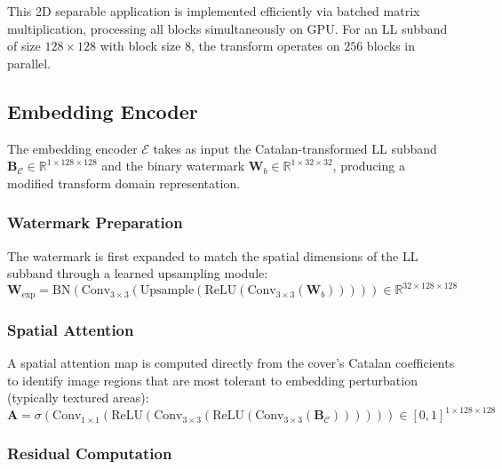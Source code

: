\documentclass[journal]{IEEEtran}
\begin{document}
This 2D separable application is implemented efficiently via batched
matrix multiplication, processing all blocks simultaneously on GPU.
For an LL subband of size $128 \times 128$ with block size $8$, the
transform operates on $256$ blocks in parallel.

\subsection{Embedding Encoder}

The embedding encoder $\mathcal{E}$ takes as input the Catalan-transformed
LL subband $\mathbf{B}_{\mathcal{C}} \in \mathbb{R}^{1 \times 128 \times 128}$
and the binary watermark $\mathbf{W}_b \in \mathbb{R}^{1 \times 32 \times 32}$,
producing a modified transform domain representation.

\subsubsection{Watermark Preparation}

The watermark is first expanded to match the spatial dimensions of the
LL subband through a learned upsampling module:
\begin{equation}
  \mathbf{W}_{\text{exp}} = \text{BN}(\text{Conv}_{3\times3}(
    \text{Upsample}(\text{ReLU}(\text{Conv}_{3\times3}(\mathbf{W}_b)))))
  \in \mathbb{R}^{32 \times 128 \times 128}
  \label{eq:wm_prep}
\end{equation}

\subsubsection{Spatial Attention}

A spatial attention map is computed directly from the cover's Catalan
coefficients to identify image regions that are most tolerant to embedding
perturbation (typically textured areas):
\begin{equation}
  \mathbf{A} = \sigma\!\left(\text{Conv}_{1\times1}(
    \text{ReLU}(\text{Conv}_{3\times3}(
      \text{ReLU}(\text{Conv}_{3\times3}(\mathbf{B}_{\mathcal{C}})))))\right)
  \in [0,1]^{1 \times 128 \times 128}
  \label{eq:spatial_attn}
\end{equation}

\subsubsection{Residual Computation}
\end{document}
